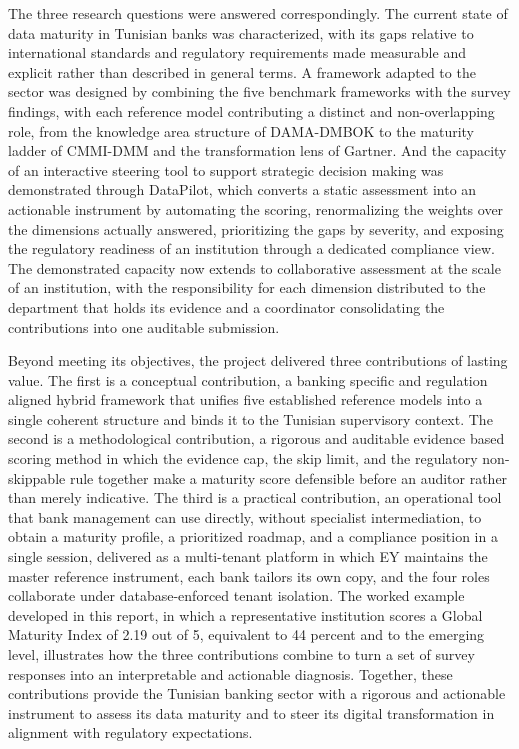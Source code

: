 The three research questions were answered correspondingly. The current state of data maturity in Tunisian banks was characterized, with its gaps relative to international standards and regulatory requirements made measurable and explicit rather than described in general terms. A framework adapted to the sector was designed by combining the five benchmark frameworks with the survey findings, with each reference model contributing a distinct and non-overlapping role, from the knowledge area structure of DAMA-DMBOK to the maturity ladder of CMMI-DMM and the transformation lens of Gartner. And the capacity of an interactive steering tool to support strategic decision making was demonstrated through DataPilot, which converts a static assessment into an actionable instrument by automating the scoring, renormalizing the weights over the dimensions actually answered, prioritizing the gaps by severity, and exposing the regulatory readiness of an institution through a dedicated compliance view. The demonstrated capacity now extends to collaborative assessment at the scale of an institution, with the responsibility for each dimension distributed to the department that holds its evidence and a coordinator consolidating the contributions into one auditable submission.

Beyond meeting its objectives, the project delivered three contributions of lasting value. The first is a conceptual contribution, a banking specific and regulation aligned hybrid framework that unifies five established reference models into a single coherent structure and binds it to the Tunisian supervisory context. The second is a methodological contribution, a rigorous and auditable evidence based scoring method in which the evidence cap, the skip limit, and the regulatory non-skippable rule together make a maturity score defensible before an auditor rather than merely indicative. The third is a practical contribution, an operational tool that bank management can use directly, without specialist intermediation, to obtain a maturity profile, a prioritized roadmap, and a compliance position in a single session, delivered as a multi-tenant platform in which EY maintains the master reference instrument, each bank tailors its own copy, and the four roles collaborate under database-enforced tenant isolation. The worked example developed in this report, in which a representative institution scores a Global Maturity Index of 2.19 out of 5, equivalent to 44 percent and to the emerging level, illustrates how the three contributions combine to turn a set of survey responses into an interpretable and actionable diagnosis. Together, these contributions provide the Tunisian banking sector with a rigorous and actionable instrument to assess its data maturity and to steer its digital transformation in alignment with regulatory expectations.

